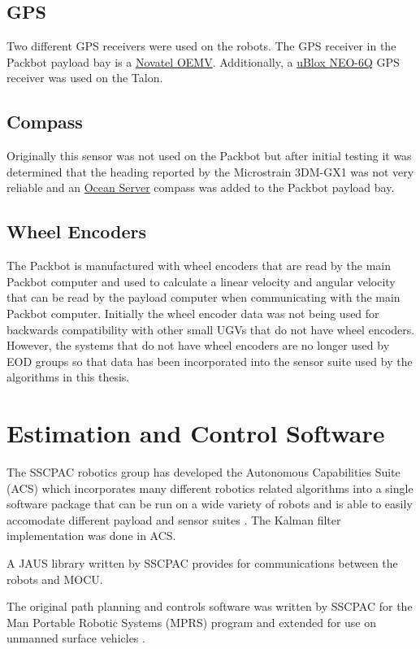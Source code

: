 \subsection{GPS}
\label{sec:bgGPS}
Two different GPS receivers were used on the robots. The GPS receiver in the Packbot payload bay is a \href{http://www.novatel.com/products/gnss-receivers/oem-receiver-boards/oemv-receivers/}{Novatel OEMV}. Additionally, a \href{http://www.u-blox.com/gps-modules.html}{uBlox NEO-6Q} GPS receiver was used on the Talon.

\subsection{Compass}
\label{sec:bgCompass}
Originally this sensor was not used on the Packbot but after initial testing it was determined that the heading reported by the Microstrain 3DM-GX1 was not very reliable and an \href{http://www.oceanserver-store.com/os3axdico3.html}{Ocean Server} compass was added to the Packbot payload bay.

\subsection{Wheel Encoders}
\label{sec:bgEncoders}
The Packbot is manufactured with wheel encoders that are read by the main Packbot computer and used to calculate a linear velocity and angular velocity that can be read by the payload computer when communicating with the main Packbot computer. Initially the wheel encoder data was not being used for backwards compatibility with other small UGVs that do not have wheel encoders. However, the systems that do not have wheel encoders are no longer used by EOD groups so that data has been incorporated into the sensor suite used by the algorithms in this thesis.

\section{Estimation and Control Software}
\label{sec:bgSoftware}
The SSCPAC robotics group has developed the Autonomous Capabilities Suite (ACS) which incorporates many different robotics related algorithms into a single software package that can be run on a wide variety of robots and is able to easily accomodate different payload and sensor suites \cite{Sights06}. The Kalman filter implementation was done in ACS.

A JAUS library written by SSCPAC provides for communications between the robots and MOCU.

The original path planning and controls software was written by SSCPAC for the Man Portable Robotic Systems (MPRS) program \cite{Bruch02} and extended for use on unmanned surface vehicles \cite{Ebken05, Larson06, Larson07}.

